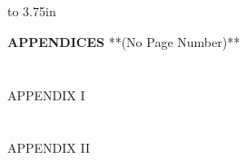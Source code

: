 

\chapter*{}

\thispagestyle{empty}

\vbox to 3.75in{}
\begin{center}
{\textbf{APPENDICES}}
\vfill
**(No Page Number)**
\end{center}

\addtocounter{page}{-1}
\newpage


\chapter*{}
\begin{center}
APPENDIX I
\end{center}

\chapter*{}
\begin{center}
APPENDIX II
\end{center}
